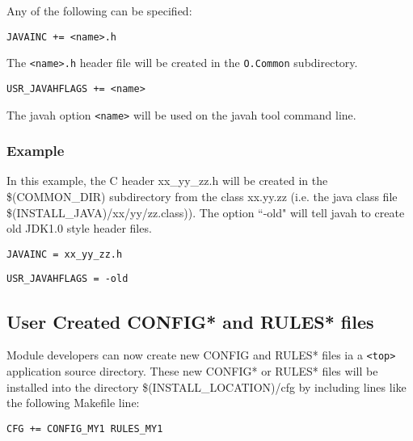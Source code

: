 Any of the following can be specified:

\begin{description}

\item {}\verb|JAVAINC += <name>.h|

The \verb|<name>.h| header file will be created in the \verb|O.Common| subdirectory.

\item {}\verb|USR_JAVAHFLAGS += <name>|

The javah option \verb|<name>| will be used on the javah tool command line.

\end{description}

\subsubsection{Example}

In this example, the C header xx\_yy\_zz.h will be created in the \$(COMMON\_DIR) subdirectory from the class xx.yy.zz 
(i.e. the java class file \$(INSTALL\_JAVA)/xx/yy/zz.class)). The option ``-old" will tell javah to create old JDK1.0 style 
header files.

\begin{description}
\item \verb|JAVAINC = xx_yy_zz.h|

\item \verb|USR_JAVAHFLAGS = -old|

\end{description}

\subsection{User Created CONFIG* and RULES* files}

Module developers can now create new CONFIG and RULES* files ia a \verb|<top>| application source directory. These new 
CONFIG* or RULES* files will be installed into the directory \$(INSTALL\_LOCATION)/cfg by including lines like the 
following Makefile line:

\begin{description}
\item {}\verb|CFG += CONFIG_MY1 RULES_MY1|

\end{description}

